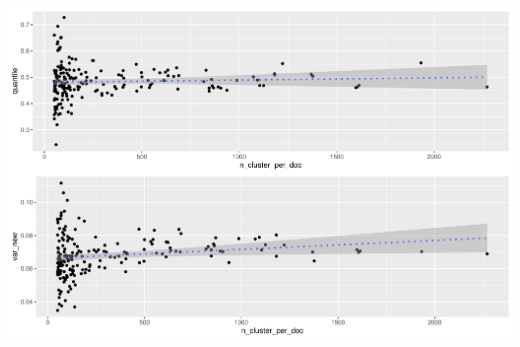 \documentclass{tum-presentation}
\begin{document}
\begin{frame}
\begin{columns}
    \begin{minipage}[c]{\linewidth}
        \centering
        \includegraphics[width=0.95\linewidth]{figures/num_commentsentences_var_quantilesp_1585_cluster_weight.pdf}
    \end{minipage}
\end{columns}
\end{frame}
\end{document}
